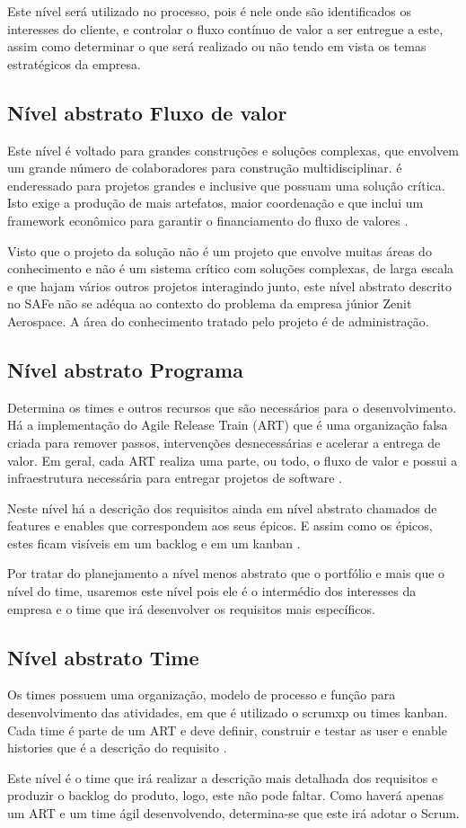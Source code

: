 Este nível será utilizado no processo, pois é nele onde são identificados os interesses do cliente, e controlar o fluxo contínuo de valor a ser entregue a este, assim como determinar o que será realizado ou não tendo em vista os temas estratégicos da empresa.

\subsection{Nível abstrato Fluxo de valor}

Este nível é voltado para grandes construções e soluções complexas, que envolvem um grande número de colaboradores para construção multidisciplinar. é enderessado para projetos grandes e inclusive que possuam uma solução crítica. Isto exige a produção de mais artefatos, maior coordenação e que inclui um framework econômico para garantir o financiamento do fluxo de valores \cite{safe}.

Visto que o projeto da solução não é um projeto que envolve muitas áreas do conhecimento e não é um sistema crítico com soluções complexas, de larga escala e que hajam vários outros projetos interagindo junto, este nível abstrato descrito no SAFe não se adéqua ao contexto do problema da empresa júnior Zenit Aerospace. A área do conhecimento tratado pelo projeto é de administração.

\subsection{Nível abstrato Programa}

Determina os times e outros recursos que são necessários para o desenvolvimento. Há a implementação do Agile Release Train (ART) que é uma organização falsa criada para remover passos, intervenções desnecessárias e acelerar a entrega de valor. Em geral, cada ART realiza uma parte, ou todo, o fluxo de valor e possui a infraestrutura necessária para entregar projetos de software \cite{safe}.

Neste nível há a descrição dos requisitos ainda em nível abstrato chamados de features e enables que correspondem aos seus épicos. E assim como os épicos, estes ficam visíveis em um backlog e em um kanban \cite{safe}.

Por tratar do planejamento a nível menos abstrato que o portfólio e mais que o nível do time, usaremos este nível pois ele é o intermédio dos interesses da empresa e o time que irá desenvolver os requisitos mais específicos.

\subsection{Nível abstrato Time}

Os times possuem uma organização, modelo de processo e função para desenvolvimento das atividades, em que é utilizado o scrumxp ou times kanban. Cada time é parte de um ART e deve definir, construir e testar as user e enable histories que é a descrição do requisito \cite{safe}.

Este nível é o time que irá realizar a descrição mais detalhada dos requisitos e produzir o backlog do produto, logo, este não pode faltar. Como haverá apenas um ART e um time ágil desenvolvendo, determina-se que este irá adotar o Scrum.
